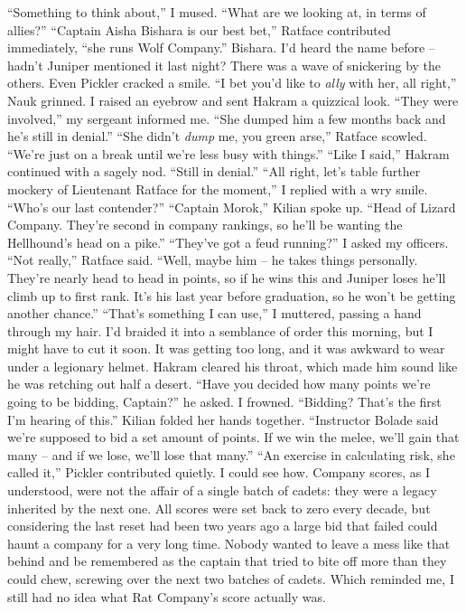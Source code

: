 \documentclass[12pt, openany]{book}
\begin{document}
“Something to think about,” I mused. “What are we looking at, in terms of allies?”
“Captain Aisha Bishara is our best bet,” Ratface contributed immediately, “she runs Wolf Company.”
Bishara. I’d heard the name before – hadn’t Juniper mentioned it last night? There was a wave of snickering by the others. Even Pickler cracked a smile.
“I bet you’d like to \textit{ally} with her, all right,” Nauk grinned.
I raised an eyebrow and sent Hakram a quizzical look.
“They were involved,” my sergeant informed me. “She dumped him a few months back and he’s still in denial.”
“She didn’t \textit{dump} me, you green arse,” Ratface scowled. “We’re just on a break until we’re less busy with things.”
“Like I said,” Hakram continued with a sagely nod. “Still in denial.”
“All right, let’s table further mockery of Lieutenant Ratface for the moment,” I replied with a wry smile. “Who’s our last contender?”
“Captain Morok,” Kilian spoke up. “Head of Lizard Company. They’re second in company rankings, so he’ll be wanting the Hellhound’s head on a pike.”
“They’ve got a feud running?” I asked my officers.
“Not really,” Ratface said. “Well, maybe him – he takes things personally. They’re nearly head to head in points, so if he wins this and Juniper loses he’ll climb up to first rank. It’s his last year before graduation, so he won’t be getting another chance.”
“That’s something I can use,” I muttered, passing a hand through my hair.
I’d braided it into a semblance of order this morning, but I might have to cut it soon. It was getting too long, and it was awkward to wear under a legionary helmet. Hakram cleared his throat, which made him sound like he was retching out half a desert.
“Have you decided how many points we’re going to be bidding, Captain?” he asked.
I frowned.
“Bidding? That’s the first I’m hearing of this.”
Kilian folded her hands together. “Instructor Bolade said we’re supposed to bid a set amount of points. If we win the melee, we’ll gain that many – and if we lose, we’ll lose that many.”
“An exercise in calculating risk, she called it,” Pickler contributed quietly.
I could see how. Company scores, as I understood, were not the affair of a single batch of cadets: they were a legacy inherited by the next one. All scores were set back to zero every decade, but considering the last reset had been two years ago a large bid that failed could haunt a company for a very long time. Nobody wanted to leave a mess like that behind and be remembered as the captain that tried to bite off more than they could chew, screwing over the next two batches of cadets. Which reminded me, I still had no idea what Rat Company’s score actually was.
\end{document}
